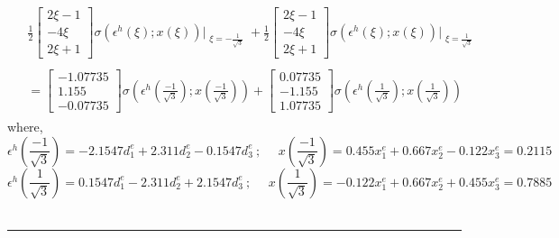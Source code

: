 \documentclass[11pt]{article}
\begin{document}
\begin{align}
\begin{split}
& \frac{1}{2}\begin{bmatrix}
2\xi - 1 \\ -4\xi \\ 2\xi+1
\end{bmatrix} \sigma \left(\epsilon^h(\xi); x(\xi) \right) \Bigr|_{\substack{\xi = -\frac{1}{\sqrt{3}}}} 
+ 
\frac{1}{2}\begin{bmatrix}
2\xi - 1 \\ -4\xi \\ 2\xi+1
\end{bmatrix} \sigma \left(\epsilon^h(\xi); x(\xi) \right) \Bigr|_{\substack{\xi = \frac{1}{\sqrt{3}}}} \\ \\
& = \begin{bmatrix}
-1.07735 \\ 1.155 \\ -0.07735
\end{bmatrix} \sigma \left(\epsilon^h(\frac{-1}{\sqrt{3}}); x(\frac{-1}{\sqrt{3}}) \right) 
+ \begin{bmatrix}
0.07735 \\ -1.155 \\ 1.07735
\end{bmatrix}\sigma \left(\epsilon^h(\frac{1}{\sqrt{3}}); x(\frac{1}{\sqrt{3}}) \right)
\end{split}
\end{align}
where, 
\[
\epsilon^h \left(\frac{-1}{\sqrt{3}} \right) 
= 
-2.1547 d^e_1 + 2.311 d^e_2 - 0.1547 d^e_3\ ; \ \ \ \ \ \ 
x\left(\frac{-1}{\sqrt{3}} \right) 
= 0.455 x^e_1 + 0.667 x^e_2 -0.122 x^e_3 = 0.2115
\]
\[
\epsilon^h \left(\frac{1}{\sqrt{3}} \right) 
= 
0.1547 d^e_1 - 2.311 d^e_2 + 2.1547 d^e_3\ ; \ \ \ \ \ \ x\left(\frac{1}{\sqrt{3}} \right) 
= -0.122 x^e_1 + 0.667 x^e_2 + 0.455 x^e_3 = 0.7885
\] \\ \hrule 
\end{document}
